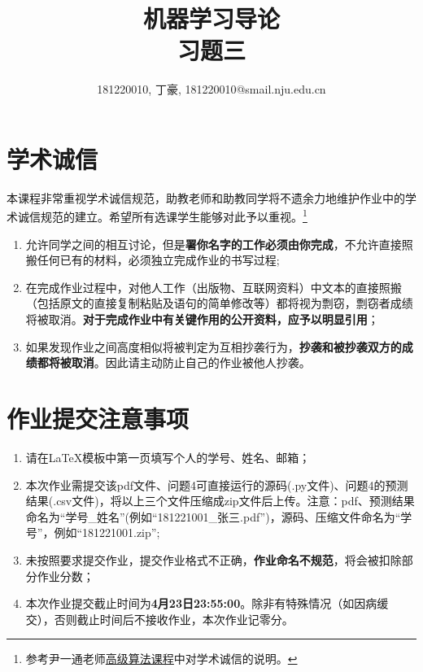 \documentclass[a4paper,UTF8]{article}
\theoremstyle{definition}
\begin{document}
\title{机器学习导论\\习题三}
\author{181220010, 丁豪, 181220010@smail.nju.edu.cn}
\maketitle


\section*{学术诚信}

本课程非常重视学术诚信规范，助教老师和助教同学将不遗余力地维护作业中的学术诚信规范的建立。希望所有选课学生能够对此予以重视。\footnote{参考尹一通老师\href{http://tcs.nju.edu.cn/wiki/}{高级算法课程}中对学术诚信的说明。}

\begin{tcolorbox}
	\begin{enumerate}
		\item[(1)] 允许同学之间的相互讨论，但是{\color{red}\textbf{署你名字的工作必须由你完成}}，不允许直接照搬任何已有的材料，必须独立完成作业的书写过程;
		\item[(2)] 在完成作业过程中，对他人工作（出版物、互联网资料）中文本的直接照搬（包括原文的直接复制粘贴及语句的简单修改等）都将视为剽窃，剽窃者成绩将被取消。{\color{red}\textbf{对于完成作业中有关键作用的公开资料，应予以明显引用}}；
		\item[(3)] 如果发现作业之间高度相似将被判定为互相抄袭行为，{\color{red}\textbf{抄袭和被抄袭双方的成绩都将被取消}}。因此请主动防止自己的作业被他人抄袭。
	\end{enumerate}
\end{tcolorbox}

\section*{作业提交注意事项}
\begin{tcolorbox}
	\begin{enumerate}
		\item[(1)] 请在LaTeX模板中第一页填写个人的学号、姓名、邮箱；
		\item[(2)] 本次作业需提交该pdf文件、问题4可直接运行的源码(.py文件)、问题4的预测结果(.csv文件)，将以上三个文件压缩成zip文件后上传。注意：pdf、预测结果命名为“学号\_姓名”(例如“181221001\_张三.pdf”)，源码、压缩文件命名为“学号”，例如“181221001.zip”;
		\item[(3)] 未按照要求提交作业，提交作业格式不正确，{\color{red}\textbf{作业命名不规范}}，将会被扣除部分作业分数；
		\item[(4)] 本次作业提交截止时间为{\color{red}\textbf{4月23日23:55:00}}。除非有特殊情况（如因病缓交），否则截止时间后不接收作业，本次作业记零分。
	\end{enumerate}
\end{tcolorbox}
\end{document}
